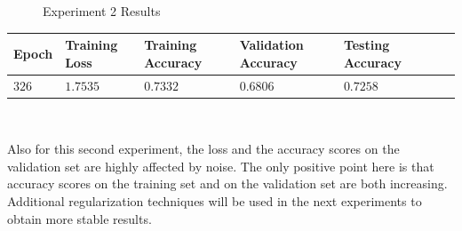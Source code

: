 \documentclass[11pt,a4paper]{article}
\begin{document}
\begin{figure}[H]
    \caption{Experiment 2 Results}
\end{figure}
\begin{center}
\hspace*{-0.8cm}
\begin{tabular}{|p{1.2cm}|p{1.8cm}|p{2cm}|p{2cm}|p{2cm}|p{2cm}|p{2cm}|}
\rowcolor{gray!50}
\hline
\textbf{Epoch} & \textbf{Training Loss} & \textbf{Training Accuracy} & \textbf{Validation Accuracy} & \textbf{Testing Accuracy}\\
\hline
$326$ & $1.7535$ & $0.7332$ & $0.6806$ & $0.7258$\\
\hline
\end{tabular}\\
\end{center}
Also for this second experiment, the loss and the accuracy scores on the validation set are highly affected by noise. The only positive point here is that accuracy scores on the training set and on the validation set are both increasing. Additional regularization techniques will be used in the next experiments to obtain more stable results.
\end{document}
